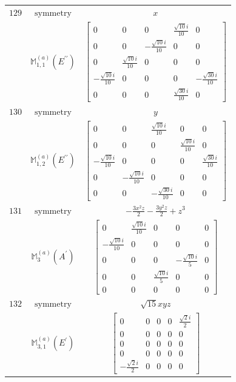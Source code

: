 \documentclass[fleqn,8pt,landscape]{jsarticle}
\begin{document}
\begin{longtable}{ccc}
$ 129 $ & $ \text{symmetry} $ & $ x $ \\
$  $ & $ \mathbb{M}_{1,1}^{(a)}(E^{\prime\prime}) $ & $ \begin{bmatrix} 0 & 0 & 0 & \frac{\sqrt{10} i}{10} & 0 \\ 0 & 0 & - \frac{\sqrt{10} i}{10} & 0 & 0 \\ 0 & \frac{\sqrt{10} i}{10} & 0 & 0 & 0 \\ - \frac{\sqrt{10} i}{10} & 0 & 0 & 0 & - \frac{\sqrt{30} i}{10} \\ 0 & 0 & 0 & \frac{\sqrt{30} i}{10} & 0 \end{bmatrix} $ \\ \hline
$ 130 $ & $ \text{symmetry} $ & $ y $ \\
$  $ & $ \mathbb{M}_{1,2}^{(a)}(E^{\prime\prime}) $ & $ \begin{bmatrix} 0 & 0 & \frac{\sqrt{10} i}{10} & 0 & 0 \\ 0 & 0 & 0 & \frac{\sqrt{10} i}{10} & 0 \\ - \frac{\sqrt{10} i}{10} & 0 & 0 & 0 & \frac{\sqrt{30} i}{10} \\ 0 & - \frac{\sqrt{10} i}{10} & 0 & 0 & 0 \\ 0 & 0 & - \frac{\sqrt{30} i}{10} & 0 & 0 \end{bmatrix} $ \\ \hline
$ 131 $ & $ \text{symmetry} $ & $ - \frac{3 x^{2} z}{2} - \frac{3 y^{2} z}{2} + z^{3} $ \\
$  $ & $ \mathbb{M}_{3}^{(a)}(A^{\prime}) $ & $ \begin{bmatrix} 0 & \frac{\sqrt{10} i}{10} & 0 & 0 & 0 \\ - \frac{\sqrt{10} i}{10} & 0 & 0 & 0 & 0 \\ 0 & 0 & 0 & - \frac{\sqrt{10} i}{5} & 0 \\ 0 & 0 & \frac{\sqrt{10} i}{5} & 0 & 0 \\ 0 & 0 & 0 & 0 & 0 \end{bmatrix} $ \\ \hline
$ 132 $ & $ \text{symmetry} $ & $ \sqrt{15} x y z $ \\
$  $ & $ \mathbb{M}_{3,1}^{(a)}(E^{\prime}) $ & $ \begin{bmatrix} 0 & 0 & 0 & 0 & \frac{\sqrt{2} i}{2} \\ 0 & 0 & 0 & 0 & 0 \\ 0 & 0 & 0 & 0 & 0 \\ 0 & 0 & 0 & 0 & 0 \\ - \frac{\sqrt{2} i}{2} & 0 & 0 & 0 & 0 \end{bmatrix} $ \\ \hline

\end{longtable}
\end{document}
